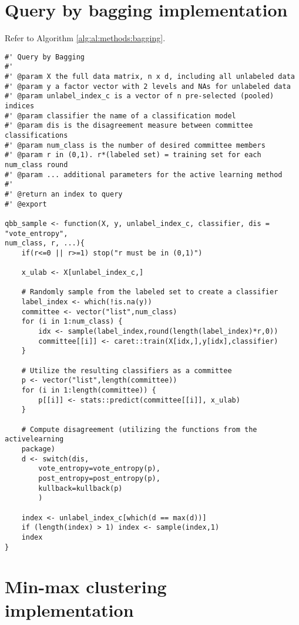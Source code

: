 \section{Query by bagging implementation}
\label{sec:appendicies:al:bagging}

Refer to Algorithm \ref{alg:al:methods:bagging}. 
{
\begin{lstlisting}
#' Query by Bagging
#'
#' @param X the full data matrix, n x d, including all unlabeled data
#' @param y a factor vector with 2 levels and NAs for unlabeled data
#' @param unlabel_index_c is a vector of n pre-selected (pooled) indices
#' @param classifier the name of a classification model
#' @param dis is the disagreement measure between committee classifications
#' @param num_class is the number of desired committee members
#' @param r in (0,1). r*(labeled set) = training set for each num_class round
#' @param ... additional parameters for the active learning method
#'
#' @return an index to query
#' @export

qbb_sample <- function(X, y, unlabel_index_c, classifier, dis = "vote_entropy", 
num_class, r, ...){
	if(r<=0 || r>=1) stop("r must be in (0,1)")
	
	x_ulab <- X[unlabel_index_c,]
	
	# Randomly sample from the labeled set to create a classifier
	label_index <- which(!is.na(y))
	committee <- vector("list",num_class)
	for (i in 1:num_class) {
		idx <- sample(label_index,round(length(label_index)*r,0))
		committee[[i]] <- caret::train(X[idx,],y[idx],classifier)
	}
	
	# Utilize the resulting classifiers as a committee
	p <- vector("list",length(committee))
	for (i in 1:length(committee)) {
		p[[i]] <- stats::predict(committee[[i]], x_ulab)
	}
	
	# Compute disagreement (utilizing the functions from the activelearning 
	package)
	d <- switch(dis,
		vote_entropy=vote_entropy(p),
		post_entropy=post_entropy(p),
		kullback=kullback(p)
		)
	
	index <- unlabel_index_c[which(d == max(d))]
	if (length(index) > 1) index <- sample(index,1)
	index
}
\end{lstlisting}
}

\section{Min-max clustering implementation}
\label{sec:appendicies:al:clustering}

